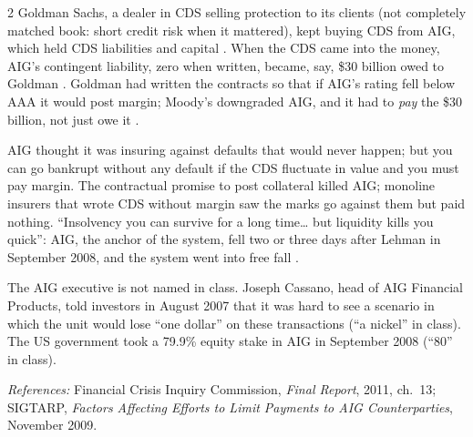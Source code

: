 \begin{paracol}{2}
Goldman Sachs, a dealer in CDS selling protection to its clients (not completely matched book: short credit risk when it mattered), kept buying CDS from AIG, which held
CDS liabilities and capital . When the CDS came into the money, AIG's contingent liability, zero when
written, became, say, \$30 billion owed to Goldman . Goldman had written the contracts so that if AIG's rating fell below AAA it
would post margin; Moody's downgraded AIG, and it had to \emph{pay} the \$30 billion, not just owe it .

\begin{nfigure}
\begin{taccts}
\qquad
{}
\end{taccts}
\caption{AIG as private backstop of CDS market making; ``say \$30 billion'' in class; the notes give about \$30 billion of collateral posted to Goldman's segregated account by the
time AIG failed .}\label{fig:cds-aig}
\end{nfigure}

\begin{intuition}
AIG thought it was insuring against defaults that would never happen; but you can go bankrupt without any default if the CDS fluctuate in value and you must pay
margin. The contractual promise to post collateral killed AIG; monoline insurers that wrote CDS without margin saw the marks go against them but paid nothing.
``Insolvency you can survive for a long time\ldots{} but liquidity kills you quick'': AIG, the anchor of the system, fell two or three days after Lehman in September
2008, and the system went into free fall .
\end{intuition}

\begin{coursenote}
The AIG executive is not named in class. Joseph Cassano, head of AIG Financial Products, told investors in August 2007 that it was hard to see a scenario in which
the unit would lose ``one dollar'' on these transactions (``a nickel'' in class). The US government took a 79.9\% equity stake in AIG in September 2008 (``80'' in
class).\par
\emph{References:} Financial Crisis Inquiry Commission, \emph{Final Report}, 2011, ch.~13; SIGTARP, \emph{Factors Affecting Efforts to Limit Payments to AIG Counterparties},
November 2009.
\end{coursenote}


\end{paracol}
